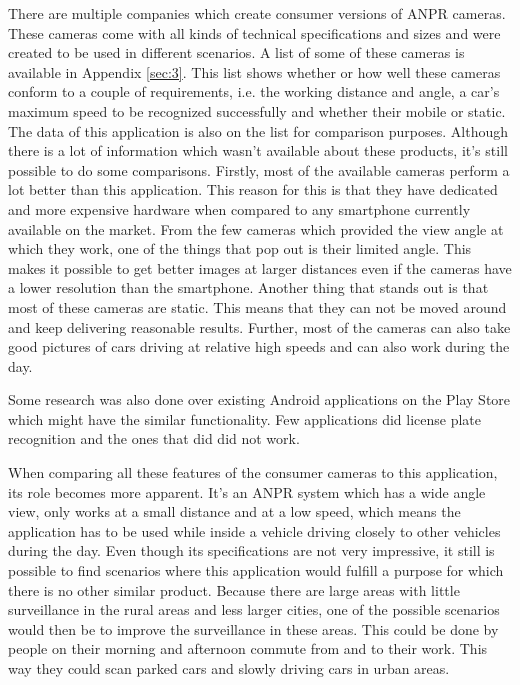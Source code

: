 
There are multiple companies which create consumer versions of ANPR cameras. These cameras come with all kinds of technical specifications and sizes and were created to be used in different scenarios. A list of some of these cameras is available in Appendix \ref{sec:3}. This list shows whether or how well these cameras conform to a couple of requirements, i.e. the working distance and angle, a car's maximum speed to be recognized successfully and whether their mobile or static. The data of this application is also on the list for comparison purposes. Although there is a lot of information which wasn't available about these products, it's still possible to do some comparisons. Firstly, most of the available cameras perform a lot better than this application. This reason for this is that they have dedicated and more expensive hardware when compared to any smartphone currently available on the market. From the few cameras which provided the view angle at which they work, one of the things that pop out is their limited angle. This makes it possible to get better images at larger distances even if the cameras have a lower resolution than the smartphone. Another thing that stands out is that most of these cameras are static. This means that they can not be moved around and keep delivering reasonable results. Further, most of the cameras can also take good pictures of cars driving at relative high speeds and can also work during the day.

Some research was also done over existing Android applications on the Play Store which might have the similar functionality. Few applications did license plate recognition and the ones that did did not work.


When comparing all these features of the consumer cameras to this application, its role becomes more apparent. It's an ANPR system which has a wide angle view, only works at a small distance and at a low speed, which means the application has to be used while inside a vehicle driving closely to other vehicles during the day. Even though its specifications are not very impressive, it still is possible to find scenarios where this application would fulfill a purpose for which there is no other similar product. Because there are large areas with little surveillance in the rural areas and less larger cities, one of the possible scenarios would then be to improve the surveillance in these areas. This could be done by people on their morning and afternoon commute from and to their work. This way they could scan parked cars and slowly driving cars in urban areas.
